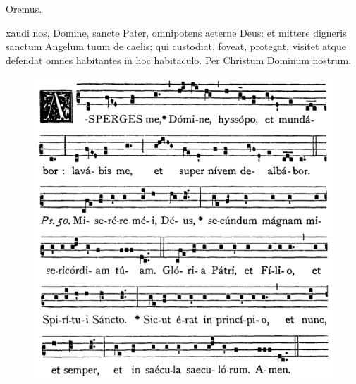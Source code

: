 Oremus.

xaudi nos, Domine, sancte Pater, omnipotens aeterne Deus: et
mittere digneris sanctum Angelum tuum de caelis; qui custodiat, foveat,
protegat, visitet atque defendat omnes habitantes in hoc habitaculo.  Per
Christum Dominum nostrum.


\vfill
\begin{figure}[h]
    \centering
    \includegraphics[scale=0.3]{img/asperges.png}
\end{figure}
\vfill
